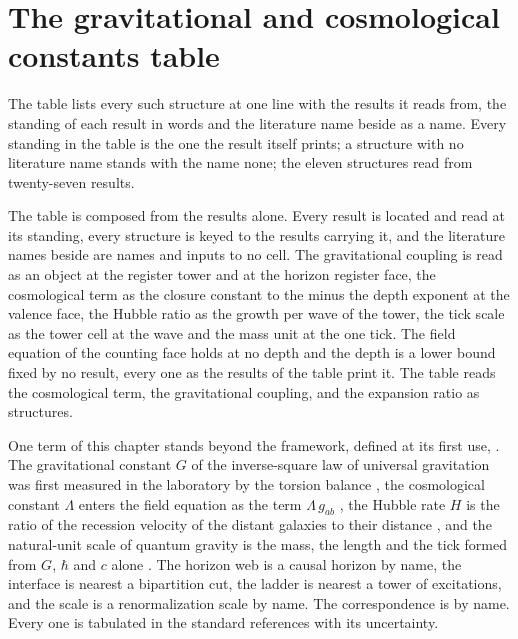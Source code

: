 \section{The gravitational and cosmological constants table}\label{mod:X-9-gravitational-and-cosmological-constants-table}
\begin{chtable}
The table lists every such structure at one line with the results it reads from, the standing of each result in words and the literature name beside as a name. Every standing in the table is the one the result itself prints; a structure with no literature name stands with the name none; the eleven structures read from twenty-seven results.
\end{chtable}
\chdeps{}{}
The table is composed from the results alone. Every result is located and read at its standing, every structure is keyed to the results carrying it, and the literature names beside are names and inputs to no cell. The gravitational coupling is read as an object at the register tower and at the horizon register face, the cosmological term as the closure constant to the minus the depth exponent at the valence face, the Hubble ratio as the growth per wave of the tower, the tick scale as the tower cell at the wave and the mass unit at the one tick. The field equation of the counting face holds at no depth and the depth is a lower bound fixed by no result, every one as the results of the table print it. The table reads the cosmological term, the gravitational coupling, and the expansion ratio as structures.
\begin{chbridge}
One term of this chapter stands beyond the framework, defined at its first use, . The gravitational constant $G$ of the inverse-square law of universal gravitation \cite{Newton1687} was first measured in the laboratory by the torsion balance \cite{Cavendish1798}, the cosmological constant $\Lambda$ enters the field equation as the term $\Lambda\, g_{ab}$ \cite{Einstein1917}, the Hubble rate $H$ is the ratio of the recession velocity of the distant galaxies to their distance \cite{Hubble1929}, and the natural-unit scale of quantum gravity is the mass, the length and the tick formed from $G$, $\hbar$ and $c$ alone \cite{Planck1899}. The horizon web is a causal horizon by name, the interface is nearest a bipartition cut, the ladder is nearest a tower of excitations, and the scale is a renormalization scale by name. The correspondence is by name. Every one is tabulated in the standard references with its uncertainty.
\end{chbridge}
